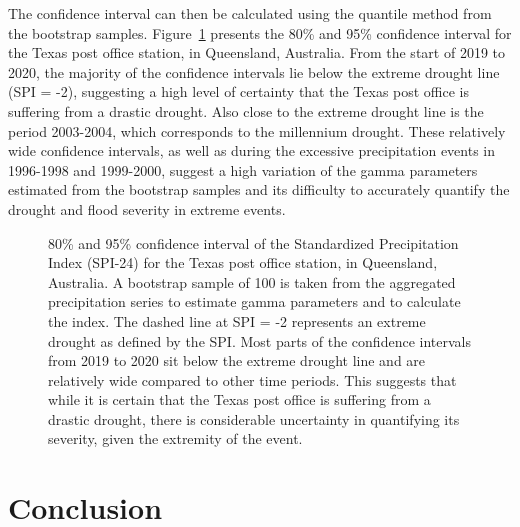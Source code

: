 \documentclass[
]{interact}
\begin{document}
The confidence interval can then be calculated using the quantile method
from the bootstrap samples. Figure~\ref{fig-conf-interval} presents the
80\% and 95\% confidence interval for the Texas post office station, in
Queensland, Australia. From the start of 2019 to 2020, the majority of
the confidence intervals lie below the extreme drought line (SPI = -2),
suggesting a high level of certainty that the Texas post office is
suffering from a drastic drought. Also close to the extreme drought line
is the period 2003-2004, which corresponds to the millennium drought.
These relatively wide confidence intervals, as well as during the
excessive precipitation events in 1996-1998 and 1999-2000, suggest a
high variation of the gamma parameters estimated from the bootstrap
samples and its difficulty to accurately quantify the drought and flood
severity in extreme events.

\begin{figure}


\caption{\label{fig-conf-interval}80\% and 95\% confidence interval of
the Standardized Precipitation Index (SPI-24) for the Texas post office
station, in Queensland, Australia. A bootstrap sample of 100 is taken
from the aggregated precipitation series to estimate gamma parameters
and to calculate the index. The dashed line at SPI = -2 represents an
extreme drought as defined by the SPI. Most parts of the confidence
intervals from 2019 to 2020 sit below the extreme drought line and are
relatively wide compared to other time periods. This suggests that while
it is certain that the Texas post office is suffering from a drastic
drought, there is considerable uncertainty in quantifying its severity,
given the extremity of the event.}

\end{figure}%

\section{Conclusion}\label{conclusion}
\end{document}
